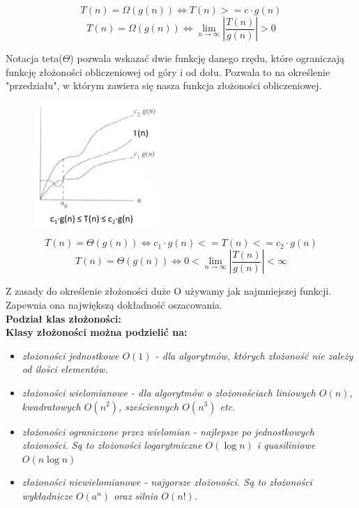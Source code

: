 \documentclass[a4paper,12pt]{article}
\newcommand{\h}[1]{\noindent \bf #1 \rm \\ \noindent}
\newcommand{\italic}[1]{\it #1 \rm}
\begin{document}
\begin{equation}
	T(n) = \Omega(g(n)) \iff T(n) >= c \cdot g(n)
\end{equation}
\begin{equation}
	T(n) = \Omega(g(n)) \iff \lim\limits_{n \rightarrow \infty}|\frac{T(n)}{g(n)}| > 0
\end{equation}

\noindent
Notacja teta($\Theta$) pozwala wskazać dwie funkcję danego rzędu, które ograniczają funkcję złożoności obliczeniowej od góry i od dołu. Pozwala to na określenie "przedziału", w którym zawiera się nasza funkcja złożoności obliczeniowej.

\begin{figure}[H]
	\centering
	\includegraphics{teta.png}
\end{figure}

\begin{equation}
	T(n) = \Theta(g(n)) \iff c_1 \cdot g(n) <= T(n) <= c_2\cdot g(n)
\end{equation}
\begin{equation}
	T(n) = \Theta(g(n)) \iff 0 < \lim\limits_{n \rightarrow \infty}|\frac{T(n)}{g(n)}| < \infty
\end{equation}

\noindent
Z zasady do określenie złożoności duże O używamy jak najmniejszej funkcji. Zapewnia ona największą dokładność oszacowania.\\

\newpage
\h{Podział klas złożoności:}
Klasy złożoności można podzielić na:
\begin{itemize}
	\item \italic{złożoności jednostkowe $O(1)$} - dla algorytmów, których złożoność nie zależy od ilości elementów.
	\item \italic{złożoności wielomianowe} - dla algorytmów o złożonościach liniowych $O(n)$, kwadratowych $O(n^2)$, sześciennych $O(n^3)$ etc.
	\item \italic{złożoności ograniczone przez wielomian} - najlepsze po jednostkowych złożoności. Są to złożoności logarytmiczne $O(\log n)$ i quasiliniowe $O(n\log n)$
	\item \italic{złożoności niewielomianowe} - najgorsze złożoności. Są to złożoności wykładnicze $O(a^n)$ oraz silnia $O(n!)$.
\end{itemize}
\end{document}
